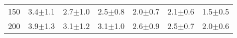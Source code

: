 \begin{tabular}{lllllll}
150 & {\cellcolor[HTML]{F0F0F0}} \color[HTML]{000000} 3.4$\pm$1.1 & {\cellcolor[HTML]{E8E8E8}} \color[HTML]{000000} 2.7$\pm$1.0 & {\cellcolor[HTML]{F4F4F4}} \color[HTML]{000000} 2.5$\pm$0.8 & {\cellcolor[HTML]{E9E9E9}} \color[HTML]{000000} 2.0$\pm$0.7 & {\cellcolor[HTML]{FBFBFB}} \color[HTML]{000000} 2.1$\pm$0.6 & {\cellcolor[HTML]{ECECEC}} \color[HTML]{000000} 1.5$\pm$0.5 \\
200 & {\cellcolor[HTML]{F1F1F1}} \color[HTML]{000000} 3.9$\pm$1.3 & {\cellcolor[HTML]{E9E9E9}} \color[HTML]{000000} 3.1$\pm$1.2 & {\cellcolor[HTML]{F5F5F5}} \color[HTML]{000000} 3.1$\pm$1.0 & {\cellcolor[HTML]{F0F0F0}} \color[HTML]{000000} 2.6$\pm$0.9 & {\cellcolor[HTML]{FDFDFD}} \color[HTML]{000000} 2.5$\pm$0.7 & {\cellcolor[HTML]{F4F4F4}} \color[HTML]{000000} 2.0$\pm$0.6 \\
\end{tabular}
